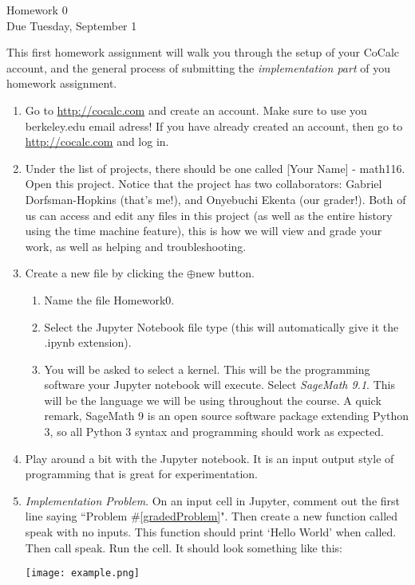 \documentclass[11pt]{article}
\begin{document}
\begin{center}
\Large {Homework 0}\\
\small {Due Tuesday, September 1}
\end{center}
This first homework assignment will walk you through the setup of your CoCalc account, and the general process of submitting the \textit{implementation part} of you homework assignment.
\begin{enumerate}
  \item{
  Go to \url{http://cocalc.com} and create an account.  Make sure to use you berkeley.edu email adress!  If you have already created an account, then go to \url{http://cocalc.com} and log in.
  }
  \item{
  Under the list of projects, there should be one called [Your Name] - math116. Open this project. Notice that the project has two collaborators: Gabriel Dorfsman-Hopkins (that's me!), and Onyebuchi Ekenta (our grader!).  Both of us can access and edit any files in this project (as well as the entire history using the time machine feature), this is how we will view and grade your work, as well as helping and troubleshooting.
  }
  \item{
  Create a new file by clicking the $\oplus$new button.
  \begin{enumerate}
    \item{Name the file Homework0.}
    \item{Select the Jupyter Notebook file type (this will automatically give it the .ipynb extension).}
    \item{You will be asked to select a kernel.  This will be the programming software your Jupyter notebook will execute.  Select \textit{SageMath 9.1}.  This will be the language we will be using throughout the course.  A quick remark, SageMath 9 is an open source software package extending Python 3, so all Python 3 syntax and programming should work as expected.}
  \end{enumerate}
  }
  \item{
  Play around a bit with the Jupyter notebook.  It is an input output style of programming that is great for experimentation.
  }
  \item\label{gradedProblem}{
  \textit{Implementation Problem}. On an input cell in Jupyter, comment out the first line saying ``Problem \#\ref{gradedProblem}".  Then create a new function called speak with no inputs.  This function should print `Hello World' when called.  Then call speak.  Run the cell.  It should look something like this:\\
  \begin{center}
    \texttt{[image: example.png]}
  \end{center}
  }
\end{enumerate}
\end{document}
